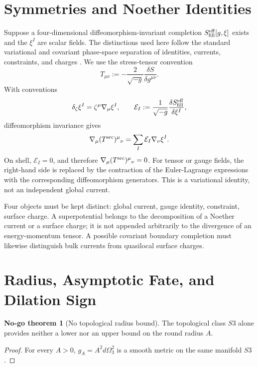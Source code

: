 \documentclass[11pt,a4paper]{article}
\def\Sthree{S3}%
\def\dd{d}%
\numberwithin{equation}{section}
\theoremstyle{definition}
\newtheorem{nogotheorem}[criterion]{No-go theorem}
\theoremstyle{plain}
\theoremstyle{remark}
\newcommand{\Sthree}{S^3}
\newcommand{\dd}{\mathrm{d}}
\begin{document}
\section{Symmetries and Noether Identities}
Suppose a four-dimensional diffeomorphism-invariant completion \(S^{\rm eff}_{\rm fill}[g,\xi]\) exists and the \(\xi^I\) are scalar fields. The distinctions used here follow the standard variational and covariant phase-space separation of identities, currents, constraints, and charges \cite{Noether1918,LeeWald1990,IyerWald1994,BarnichBrandt2002}. We use the stress-tensor convention
\begin{equation}
T_{\mu\nu}:=-\frac{2}{\sqrt{-g}}\frac{\delta S}{\delta g^{\mu\nu}}.
\end{equation}
With conventions
\begin{equation}
\delta_\zeta \xi^I=\zeta^\mu\nabla_\mu\xi^I,
\qquad
\mathcal{E}_I:=\frac{1}{\sqrt{-g}}\frac{\delta S^{\rm eff}_{\rm fill}}{\delta\xi^I},
\end{equation}
diffeomorphism invariance gives
\begin{equation}
\nabla_\mu(T^{\rm src})^{\mu}{}_{\nu}=\sum_I\mathcal{E}_I\nabla_\nu\xi^I.
\end{equation}
On shell, \(\mathcal{E}_I=0\), and therefore \(\nabla_\mu(T^{\rm src})^\mu{}_{\nu}=0\). For tensor or gauge fields, the right-hand side is replaced by the contraction of the Euler-Lagrange expressions with the corresponding diffeomorphism generators. This is a variational identity, not an independent global current.

Four objects must be kept distinct: global current, gauge identity, constraint, surface charge. A superpotential belongs to the decomposition of a Noether current or a surface charge; it is not appended arbitrarily to the divergence of an energy-momentum tensor. A possible covariant boundary completion must likewise distinguish bulk currents from quasilocal surface charges.

\section{Radius, Asymptotic Fate, and Dilation Sign}
\begin{nogotheorem}[No topological radius bound]
The topological class \(\Sthree\) alone provides neither a lower nor an upper bound on the round radius \(A\).
\end{nogotheorem}
\begin{proof}
For every \(A>0\), \(g_A=A^2\dd\Omega_3^2\) is a smooth metric on the same manifold \(\Sthree\).
\end{proof}
\end{document}
